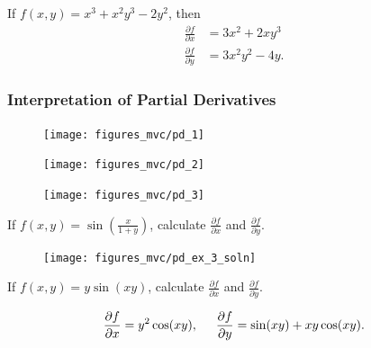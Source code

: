 \documentclass[12pt,letterpaper,reqno]{article}
\numberwithin{equation}{section}
\begin{document}
{\begin{example}
If $f(x,y)=x^3+x^2y^3-2y^2$, then
\begin{align*}
	\frac{\partial f}{\partial x}&=3x^2+2xy^3 \\
	\frac{\partial f}{\partial y}&=3x^2y^2-4y.
\end{align*}	
\end{example}
\newpage

\subsubsection{Interpretation of Partial Derivatives}

\begin{figure}[h]
	\begin{center}
		\texttt{[image: figures\_mvc/pd\_1]}
	\end{center}
\end{figure}

\begin{figure}[h]
	\begin{center}
		\texttt{[image: figures\_mvc/pd\_2]}
	\end{center}
\end{figure}

\begin{figure}[h]
	\begin{center}
		\texttt{[image: figures\_mvc/pd\_3]}
	\end{center}
\end{figure}
\newpage 
\begin{exercise}
If $f(x,y)=\sin\left(\frac{x}{1+y}\right)$, calculate $\frac{\partial f}{\partial x}$ and $\frac{\partial f}{\partial y}$.
\end{exercise}

\begin{figure}[h]
	\begin{center}
		\texttt{[image: figures\_mvc/pd\_ex\_3\_soln]}
	\end{center}
\end{figure}

\begin{exercise}
If $f(x,y)=y\sin(xy)$, calculate $\frac{\partial f}{\partial x}$ and $\frac{\partial f}{\partial y}$.	
\end{exercise}

{\color{red}
\begin{solution}
	\begin{align*}
		\frac{\partial f}{\partial x}=y^2\cos(xy), \hspace{0.5cm}
	\frac{\partial f}{\partial y}=\sin(xy)+xy\cos(xy).
	\end{align*}	
\end{solution}}

}
\end{document}
